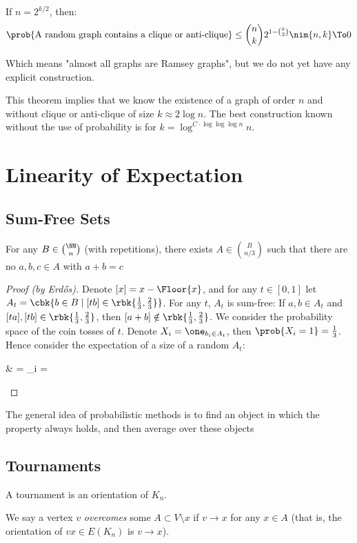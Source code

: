 \documentclass[a4paper, 11pt, oneside]{book}
\begin{document}
\begin{remark}
If $n = 2^{k/2}$, then:
\[ \prob{\text{A random graph contains a clique or anti-clique}} \le {n\choose k}2^{1-{k\choose 2}} \nim{n,k}\To 0 \]

 Which means "almost all graphs are Ramsey graphs", but we do not yet  have any explicit construction.
\end{remark}
This theorem implies that we know the existence of a graph of order $n$ and without clique or anti-clique of size $k\approx 2\log n$. The best construction known without the use of probability is for $k = \log^{C\cdot \log\log\log n}n$.

\chapter{Linearity of Expectation}
\section{Sum-Free Sets}
\begin{thm}
	For any  $B\in {\NN\choose n}$ (with repetitions), there exists $A\in {B\choose n/3}$ such that there are no $a,b,c\in A$ with $a + b = c$
\end{thm}
\begin{proof}
	[Proof (by Erd\H{o}s)] Denote $[x] = x-\Floor{x}$, and for any $t\in [0,1]$ let $A_t = \cbk{b\in B \mid [tb]\in \rbk{\frac13,\frac23}}$. 
		For any $t$, $A_t$ is sum-free: If $a,b\in A_t$ and $[ta],[tb]\in \rbk{\frac13,\frac23}$, then $[a+b]\notin \rbk{\frac13,\frac23}$. We consider the probability space of the coin tosses of $t$. Denote $X_i = \one_{b_i\in A_t}$, then $\prob{X_i=1} = \frac13$. Hence consider the expectation of a size of a random $A_t$:
		\begin{flalign*}
			&  = \sum_{i\in [n]}  = 
		\end{flalign*}
\end{proof}
\begin{remark}
The general idea of probabilistic methods is to find an object in which the property always holds, and then average over these objects	
\end{remark}

\section{Tournaments}
\begin{yellowBox}
\begin{defn}
	A tournament is an orientation of $K_n$.
\end{defn}
\begin{defn}
	We say a vertex $v$ \emph{overcomes} some $A\subset V\setminus x$ if $v\to x$ for any $x\in A$ (that is, the orientation of $vx\in E(K_n)$ is $v\to x$).
\end{defn}
\end{yellowBox}
\end{document}
